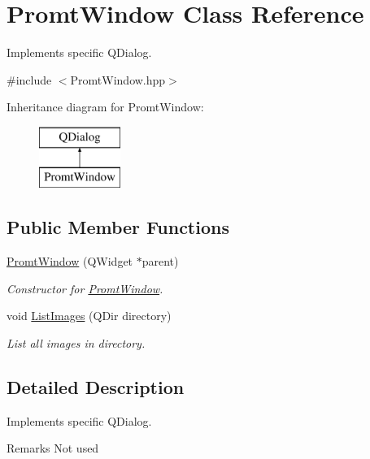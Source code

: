 \hypertarget{classPromtWindow}{}\section{Promt\+Window Class Reference}
\label{classPromtWindow}


Implements specific Q\+Dialog.  




{\ttfamily \#include $<$Promt\+Window.\+hpp$>$}

Inheritance diagram for Promt\+Window\+:\begin{figure}[H]
\begin{center}
\leavevmode
\includegraphics[height=2.000000cm]{classPromtWindow}
\end{center}
\end{figure}
\subsection*{Public Member Functions}
\begin{DoxyCompactItemize}
\item 
\mbox{\hyperlink{classPromtWindow_a6536787a099e6d7348db00b4382244a8}{Promt\+Window}} (Q\+Widget $\ast$parent)
\begin{DoxyCompactList}\small\item\em Constructor for \mbox{\hyperlink{classPromtWindow}{Promt\+Window}}. \end{DoxyCompactList}\item 
void \mbox{\hyperlink{classPromtWindow_a9f2e84ed19a4f520e0e764c31cc39362}{List\+Images}} (Q\+Dir directory)
\begin{DoxyCompactList}\small\item\em List all images in directory. \end{DoxyCompactList}\end{DoxyCompactItemize}


\subsection{Detailed Description}
Implements specific Q\+Dialog. 

\begin{DoxyRemark}{Remarks}
Not used 
\end{DoxyRemark}


